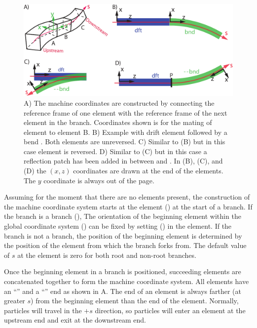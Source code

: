 \begin{figure}[tb]
  \centering
  \includegraphics[width=5in]{patch-between.pdf}
  \caption[Machine coordinates construction.]{A) The machine coordinates are constructed by
connecting the  reference frame of one element with the  reference frame
of the next element in the branch. Coordinates shown is for the mating of element  to element
{B}.  B) Example with drift element  followed by a bend . Both elements are
unreversed. C) Similar to (B) but in this case element  is reversed.  D) Similar to (C) but
in this case a reflection patch has been added in between  and .  In (B), (C), and
(D) the $(x,z)$ coordinates are drawn at the  end of the elements. The $y$ coordinate
is always out of the page.}
  \label{f:patch.between}
\end{figure}

Assuming for the moment that there are no  elements present, the construction of the
machine coordinate system starts at the  element () at the start of a
branch. If the branch is a  branch (), The orientation of the beginning
element within the global coordinate system () can be fixed by setting 
 () in the  element.
If the branch is not a  branch, the position
of the beginning element is determined by the position of the  element
from which the branch forks from. The default value of $s$ at the  element is zero
for both root and non-root branches.

Once the beginning element in a branch is positioned, succeeding elements are concatenated together
to form the machine coordinate system. All elements have an ``'' and a ``''
end as shown in A. The  end of an element is always farther (at
greater $s$) from the beginning element than the  end of the element. Normally,
particles will travel
in the $+s$ direction, so particles will enter an element at the upstream end and exit at the
downstream end.

